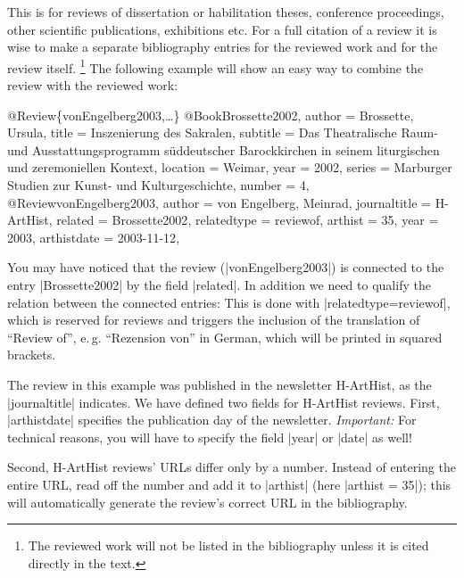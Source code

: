 \documentclass[a4paper,
10pt,
ngerman,
english
]{ltxdoc}
\begin{document}
This is for reviews of dissertation or habilitation theses, conference proceedings, other scientific publications, exhibitions etc.
For a full citation of a review it is wise to make a separate bibliography entries for the reviewed work and for the review itself.%
\footnote{The reviewed work will not be listed in the bibliography unless it is cited directly in the text.}
The following example will show an easy way to combine the review with the reviewed work:
\begin{bibexample}[label=vonEngelberg2003]{{@}Review\{vonEngelberg2003,…\}}
@Book{Brossette2002,
  author   = {Brossette, Ursula},
  title    = {Inszenierung des Sakralen},
  subtitle = {Das Theatralische Raum- und Ausstattungsprogramm süddeutscher Barockkirchen in seinem liturgischen und zeremoniellen Kontext},
  location = {Weimar},
  year     = {2002},
  series   = {Marburger Studien zur Kunst- und Kulturgeschichte},
  number   = {4},
}
@Review{vonEngelberg2003,
  author       = {von Engelberg, Meinrad},
  journaltitle = {H-ArtHist},
  related      = {Brossette2002},
  relatedtype  = {reviewof},
  arthist      = {35},
  year         = {2003},
  arthistdate  = {2003-11-12},
}\end{bibexample}
You may have noticed that the review (|vonEngelberg2003|) is connected to the entry |Brossette2002| by the field |related|.
In addition we need to qualify the relation between the connected entries:
This is done with |relatedtype={reviewof}|, which is reserved for reviews and triggers the inclusion of the translation of \enquote{Review of}, e.\,g. \enquote{Rezension von} in German, which will be printed in squared brackets.

The review in this example was published in the newsletter H-ArtHist, as the |journaltitle| indicates. 
We have defined two fields for H-ArtHist reviews. 
First, |arthistdate| specifies the publication day of the newsletter. 
\emph{Important:} For technical reasons, you will have to specify the field |year| or |date| as well!

Second, H-ArtHist reviews' URLs differ only by a number. 
Instead of entering the entire URL, read off the number and add it to |arthist| (here |arthist = {35}|); 
this will automatically generate the review's correct URL in the bibliography.
\end{document}

